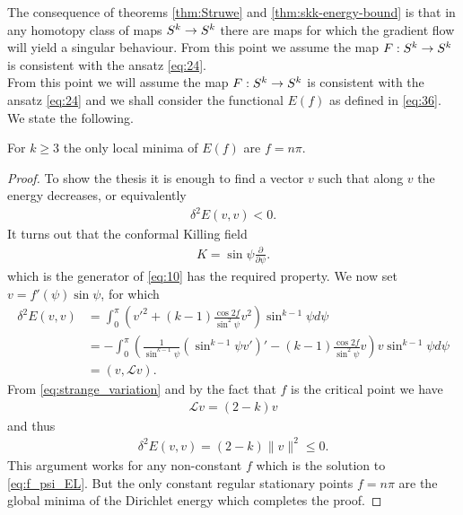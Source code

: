 The consequence of theorems \ref{thm:Struwe} and
\ref{thm:skk-energy-bound} is that in any homotopy class of maps
$S^k\rightarrow S^k$ there are maps for which the gradient flow will yield a
singular behaviour. From this point we assume the map $F:S^k\rightarrow S^k$
is
consistent with the ansatz \eqref{eq:24}.\\

From this point we will assume the map $F:S^k\rightarrow S^k$ is consistent
with the ansatz \eqref{eq:24} and we shall consider the functional
$E(f)$ as defined in \eqref{eq:36}. We state the following.

\begin{theorem}
  For $k\ge3$ the only local minima of $E(f)$ are $f=n\pi$.
\end{theorem}
\begin{proof}
  To show the thesis it is enough to find a vector $v$ such that along
  $v$ the energy decreases, or equivalently
  \begin{align}
    \label{eq:18}
    \delta^2E(v,v)<0.
  \end{align}
  It turns out that the conformal Killing field
  \begin{align}
    \label{eq:20}
    K=\sin\psi\frac{\partial}{\partial \psi}.
  \end{align}
  which is the generator of \eqref{eq:10} has the required
  property. We now set $v=f'(\psi)\sin\psi$, for which
  \begin{align}
    \delta^2E(v,v)
    &=\int_0^{\pi}
    \left(
      v'^2+(k-1)\frac{\cos2f}{\sin^2\psi}v^2
    \right)\sin^{k-1}\psi d\psi\\
    &=-\int_0^{\pi}
    \left(\frac{1}{\sin^{k-1}\psi}\left(\sin^{k-1}\psi
        v'\right)'-(k-1)\frac{\cos2f}{\sin^2\psi}v\right)v\sin^{k-1}\psi
    d\psi\\
    &=(v,\mathcal L v).
  \end{align}
  From \eqref{eq:strange_variation} and by the fact that $f$ is the
  critical point we have
  \begin{align}
    \label{eq:21}
   \mathcal{L}v=(2-k)v
  \end{align}
  and thus
  \begin{align}
    \label{eq:22}
    \delta^2 E(v,v)=(2-k)\lVert v\rVert^2\le0.
  \end{align}
  This argument works for any non-constant $f$ which is the solution
  to \eqref{eq:f_psi_EL}. But the only constant regular stationary
  points $f=n\pi$ are the global minima of the Dirichlet energy which
  completes the proof.
\end{proof}

